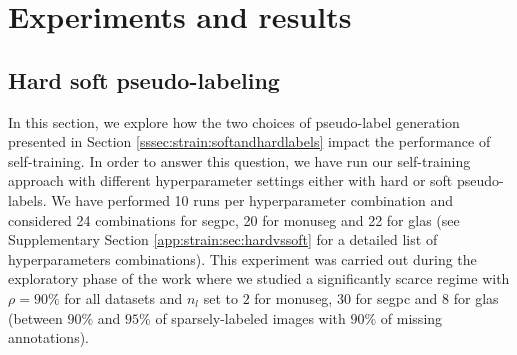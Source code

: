 
\section{Experiments and results}
\label{sec:strain:results}

\subsection{Hard \vs soft pseudo-labeling}
\label{ssec:strain:res:hardvssoft}


In this section, we explore how the two choices of pseudo-label generation presented in Section \ref{sssec:strain:softandhardlabels} impact the performance of self-training. In order to answer this question, we have run our self-training approach with different hyperparameter settings either with hard or soft pseudo-labels. We have performed 10 runs per hyperparameter combination and considered 24 combinations for \acrshort{segpc}, 20 for \acrshort{monuseg} and 22 for \acrshort{glas} (see Supplementary Section \ref{app:strain:sec:hardvssoft} for a detailed list of hyperparameters combinations). This experiment was carried out during the exploratory phase of the work where we studied a significantly scarce regime with $\rho = 90\%$ for all datasets and $n_l$ set to $2$ for \acrshort{monuseg}, $30$ for \acrshort{segpc} and $8$ for \acrshort{glas} (\ie between $90\%$ and $95\%$ of sparsely-labeled images with $90\%$ of missing annotations).

